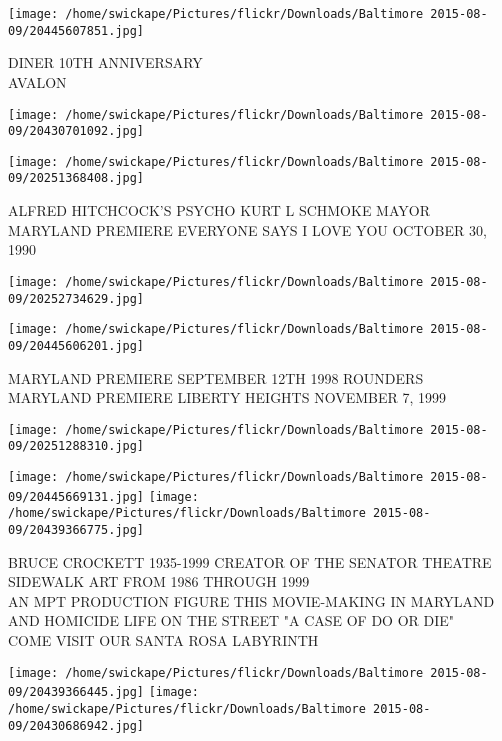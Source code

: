\documentclass[10pt,letterpaper]{article}
\begin{document}
\vspace{0.25in}
\texttt{[image: /home/swickape/Pictures/flickr/Downloads/Baltimore 2015-08-09/20445607851.jpg]}

DINER 10TH ANNIVERSARY\\
AVALON\\
\pagebreak

\texttt{[image: /home/swickape/Pictures/flickr/Downloads/Baltimore 2015-08-09/20430701092.jpg]}

\vspace{0.25in}
\texttt{[image: /home/swickape/Pictures/flickr/Downloads/Baltimore 2015-08-09/20251368408.jpg]}

ALFRED HITCHCOCK'S PSYCHO KURT L SCHMOKE MAYOR\\
MARYLAND PREMIERE EVERYONE SAYS I LOVE YOU OCTOBER 30, 1990\\
\pagebreak

\texttt{[image: /home/swickape/Pictures/flickr/Downloads/Baltimore 2015-08-09/20252734629.jpg]}

\vspace{0.25in}
\texttt{[image: /home/swickape/Pictures/flickr/Downloads/Baltimore 2015-08-09/20445606201.jpg]}

MARYLAND PREMIERE SEPTEMBER 12TH 1998 ROUNDERS\\
MARYLAND PREMIERE LIBERTY HEIGHTS NOVEMBER 7, 1999\\
\pagebreak

\texttt{[image: /home/swickape/Pictures/flickr/Downloads/Baltimore 2015-08-09/20251288310.jpg]}

\vspace{0.25in}
\texttt{[image: /home/swickape/Pictures/flickr/Downloads/Baltimore 2015-08-09/20445669131.jpg]}
\texttt{[image: /home/swickape/Pictures/flickr/Downloads/Baltimore 2015-08-09/20439366775.jpg]}

BRUCE CROCKETT 1935{-}1999 CREATOR OF THE SENATOR THEATRE SIDEWALK ART FROM 1986 THROUGH 1999\\
AN MPT PRODUCTION FIGURE THIS MOVIE{-}MAKING IN MARYLAND AND HOMICIDE LIFE ON THE STREET "A CASE OF DO OR DIE"\\
COME VISIT OUR SANTA ROSA LABYRINTH\\
\pagebreak

\texttt{[image: /home/swickape/Pictures/flickr/Downloads/Baltimore 2015-08-09/20439366445.jpg]}
\texttt{[image: /home/swickape/Pictures/flickr/Downloads/Baltimore 2015-08-09/20430686942.jpg]}
\end{document}
